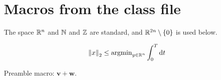 \documentclass{teststyle}
\newcommand{\vect}[1]{\mathbf{#1}}
\begin{document}
\section{Macros from the class file}

The space $\mathbb{R}^{n}$ and $\mathbb{N}$ and $\mathbb{Z}$ are standard,
and $\mathbb{R}^{2n} \setminus \{0\}$ is used below.

\begin{equation}
\left\|x\right\|_{2} \le \operatorname{argmin}_{y \in \mathbb{R}^{n}} \int_{0}^{T} \mathrm{d} t
\end{equation}

Preamble macro: $\vect{v} + \vect{w}$.
\end{document}
